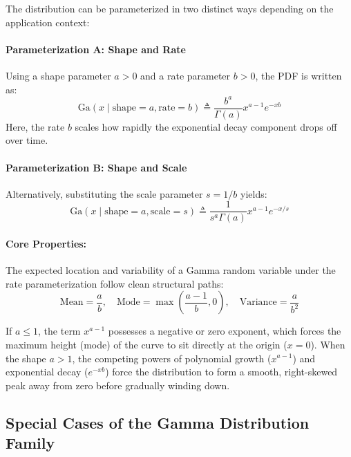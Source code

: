 \documentclass{article}
\begin{document}
The distribution can be parameterized in two distinct ways depending on the application context:

\paragraph{Parameterization A: Shape and Rate}
Using a shape parameter $a > 0$ and a rate parameter $b > 0$, the PDF is written as:
\begin{equation}
\text{Ga}(x \mid \text{shape} = a, \text{rate} = b) \triangleq \frac{b^a}{\Gamma(a)} x^{a-1} e^{-xb} \tag{202}
\end{equation}
Here, the rate $b$ scales how rapidly the exponential decay component drops off over time.

\paragraph{Parameterization B: Shape and Scale}
Alternatively, substituting the scale parameter $s = 1/b$ yields:
\begin{equation}
\text{Ga}(x \mid \text{shape} = a, \text{scale} = s) \triangleq \frac{1}{s^a \Gamma(a)} x^{a-1} e^{-x/s} \tag{203}
\end{equation}

\paragraph{Core Properties:}
The expected location and variability of a Gamma random variable under the rate parameterization follow clean structural paths:
\begin{equation*}
\text{Mean} = \frac{a}{b}, \quad \text{Mode} = \max\left(\frac{a - 1}{b}, 0\right), \quad \text{Variance} = \frac{a}{b^2}
\end{equation*}

If $a \le 1$, the term $x^{a-1}$ possesses a negative or zero exponent, which forces the maximum height (mode) of the curve to sit directly at the origin ($x=0$). When the shape $a > 1$, the competing powers of polynomial growth ($x^{a-1}$) and exponential decay ($e^{-xb}$) force the distribution to form a smooth, right-skewed peak away from zero before gradually winding down.

\subsection*{Special Cases of the Gamma Distribution Family}
\end{document}
